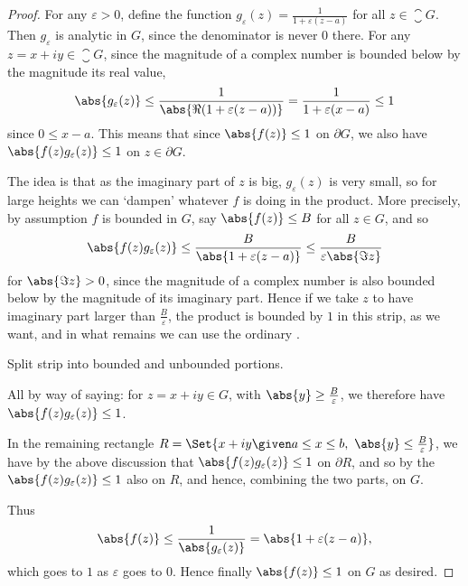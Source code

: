 \begin{proof}
	For any $\varepsilon > 0$, define the function $g_\varepsilon(z) = \frac{1}{1 + \varepsilon(z - a)}$ for all $z \in \closure{G}$.
	Then $g_\varepsilon$ is analytic in $G$, since the denominator is never $0$ there.
	For any $z = x + i y \in \closure{G}$, since the magnitude of a complex number is bounded below by the magnitude its real value,
	\[
		\abs{g_\varepsilon(z)} \leq \frac{1}{\abs{\Re(1 + \varepsilon(z - a))}} = \frac{1}{1 + \varepsilon(x - a)} \leq 1
	\]
	since $0 \leq x - a$.
	This means that since $\abs{f(z)} \leq 1$ on $\partial G$, we also have $\abs{f(z) g_\varepsilon(z)} \leq 1$ on $z \in \partial G$.

	The idea is that as the imaginary part of $z$ is big, $g_\varepsilon(z)$ is very small, so for large heights we can `dampen' whatever $f$ is doing in the product.
	More precisely, by assumption $f$ is bounded in $G$, say $\abs{f(z)} \leq B$ for all $z \in G$, and so
	\[
		\abs{f(z) g_\varepsilon(z)} \leq \frac{B}{\abs{1 + \varepsilon(z - a)}} \leq \frac{B}{\varepsilon \abs{\Im z}}
	\]
	for $\abs{\Im z} > 0$, since the magnitude of a complex number is also bounded below by the magnitude of its imaginary part.
	Hence if we take $z$ to have imaginary part larger than $\frac{B}{\varepsilon}$, the product is bounded by $1$ in this strip, as we want, and in what remains we can use the ordinary .

	\begin{marginfigure}

		\caption{\label{lem67:fig} Split strip into bounded and unbounded portions.}
	\end{marginfigure}

	All by way of saying: for $z = x + i y \in G$, with $\abs{y} \geq \frac{B}{\varepsilon}$, we therefore have $\abs{f(z) g_\varepsilon(z)} \leq 1$.

	In the remaining rectangle $R = \Set{x + i y \given a \leq x \leq b, ~ \abs{y} \leq \frac{B}{\varepsilon}}$, we have by the above discussion that $\abs{f(z) g_\varepsilon(z)} \leq 1$ on $\partial R$, and so by the  $\abs{f(z) g_\varepsilon(z)} \leq 1$ also on $R$, and hence, combining the two parts, on $G$.

	Thus
	\[
		\abs{f(z)} \leq \frac{1}{\abs{g_\varepsilon(z)}} = \abs{1 + \varepsilon(z - a)},
	\]
	which goes to $1$ as $\varepsilon$ goes to $0$.
	Hence finally $\abs{f(z)} \leq 1$ on $G$ as desired.
\end{proof}

